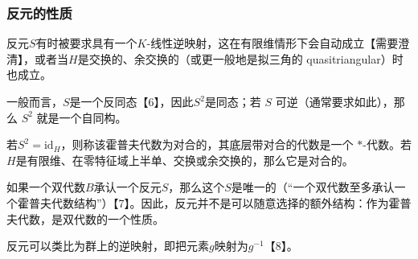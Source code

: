 \subsubsection{反元的性质}
反元$S$有时被要求具有一个$K$-线性逆映射，这在有限维情形下会自动成立【需要澄清】，或者当$H$是交换的、余交换的（或更一般地是拟三角的 quasitriangular）时也成立。

一般而言，$S$是一个反同态【6】，因此$S^2$是同态；若 $S$ 可逆（通常要求如此），那么 $S^2$ 就是一个自同构。

若$S^2 = \mathrm{id}_H$，则称该霍普夫代数为对合的，其底层带对合的代数是一个 $*$-代数。若$H$是有限维、在零特征域上半单、交换或余交换的，那么它是对合的。

如果一个双代数$B$承认一个反元$S$，那么这个$S$是唯一的（“一个双代数至多承认一个霍普夫代数结构”）【7】。因此，反元并不是可以随意选择的额外结构：作为霍普夫代数，是双代数的一个性质。

反元可以类比为群上的逆映射，即把元素$g$映射为$g^{-1}$【8】。
